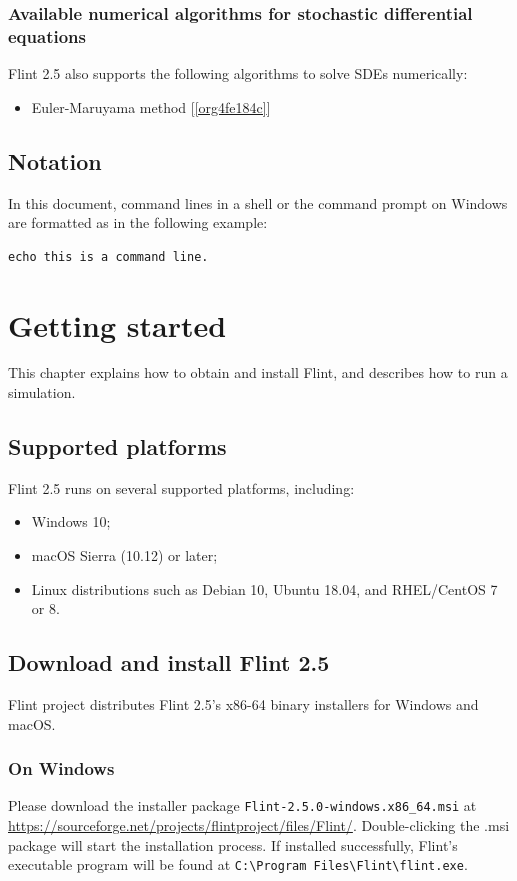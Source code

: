 \documentclass[a4paper,10pt]{report}
\begin{document}
\subsection{Available numerical algorithms for stochastic differential equations}
\label{sec:orgda5c417}
Flint 2.5 also supports the following algorithms to solve SDEs
numerically:

\begin{itemize}
\item Euler-Maruyama method [\ref{org4fe184c}]
\end{itemize}


\section{Notation}
\label{sec:orgd4abbb5}
In this document, command lines in a shell or the command prompt on Windows are
formatted as in the following example:
\begin{verbatim}
echo this is a command line.
\end{verbatim}


\chapter{Getting started}
\label{sec:orgacb2c65}

This chapter explains how to obtain and install Flint, and describes how to run
a simulation.

\section{Supported platforms}
\label{sec:org3e9610c}
Flint 2.5 runs on several supported platforms, including:

\begin{itemize}
\item Windows 10;
\item macOS Sierra (10.12) or later;
\item Linux distributions such as Debian 10, Ubuntu 18.04, and RHEL/CentOS 7 or 8.
\end{itemize}


\section{Download and install Flint 2.5}
\label{sec:org66eb5ad}
Flint project distributes Flint 2.5's x86-64 binary installers for Windows
and macOS.

\subsection{On Windows}
\label{sec:org09cdc57}
Please download the installer package \texttt{Flint-2.5.0-windows.x86\_64.msi} at
\url{https://sourceforge.net/projects/flintproject/files/Flint/}.
Double-clicking the .msi package will start the installation process.
If installed successfully, Flint's executable program will be found at
\texttt{C:\textbackslash{}Program Files\textbackslash{}Flint\textbackslash{}flint.exe}.
\end{document}
